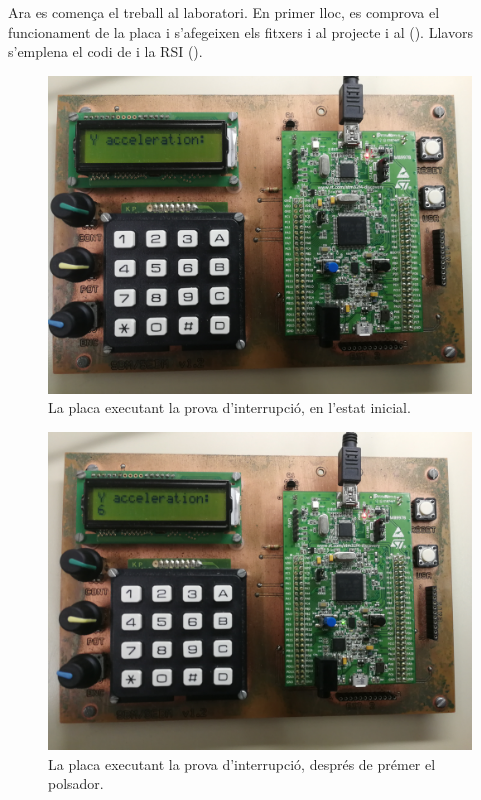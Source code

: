 Ara es comença el treball al laboratori. En primer lloc, es comprova el funcionament
de la placa i s'afegeixen els fitxers  i  al projecte
i al  ().
Llavors s'emplena el codi de  i la RSI ().

\begin{figure}[p] %
  \begin{center}
    \includegraphics[width=.82\columnwidth]{../photos/board/p4-interrupt-initial}
  \end{center}
  \caption{ \label{fig:p4-board-initial} La placa executant la prova d'interrupció, en l'estat inicial. }
\end{figure}
\begin{figure}[p]
  \begin{center}
    \includegraphics[width=.82\columnwidth]{../photos/board/p4-interrupt-use}
  \end{center}
  \caption{ \label{fig:p4-board-use} La placa executant la prova d'interrupció, després de prémer el polsador. }
\end{figure}

